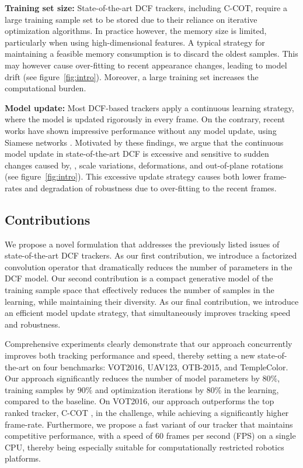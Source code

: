 \documentclass[10pt,twocolumn,letterpaper]{article}
\newcommand{\parsection}[1]{\noindent\textbf{#1:}}
\begin{document}
\parsection{Training set size}
State-of-the-art DCF trackers, including C-COT, require a large training sample set to be stored due to their reliance on iterative optimization algorithms. In practice however, the memory size is limited, particularly when using high-dimensional features. A typical strategy for maintaining a feasible memory consumption is to discard the oldest samples. This may however cause over-fitting to recent appearance changes, leading to model drift (see figure~\ref{fig:intro}). Moreover, a large training set increases the computational burden.

\parsection{Model update}
Most DCF-based trackers apply a continuous learning strategy, where the model is updated rigorously in every frame. On the contrary, recent works have shown impressive performance without any model update, using Siamese networks \cite{SiameseFC}. Motivated by these findings, we argue that the continuous model update in state-of-the-art DCF is excessive and sensitive to sudden changes caused by, \eg, scale variations, deformations, and out-of-plane rotations (see figure~\ref{fig:intro}). This excessive update strategy causes both lower frame-rates and degradation of robustness due to over-fitting to the recent frames.

\subsection{Contributions}
We propose a novel formulation that addresses the previously listed issues of state-of-the-art DCF trackers. As our first contribution, we introduce a factorized convolution operator that dramatically reduces the number of parameters in the DCF model. Our second contribution is a compact generative model of the training sample space that effectively reduces the number of samples in the learning, while maintaining their diversity. As our final contribution, we introduce an efficient model update strategy, that simultaneously improves tracking speed and robustness. 

Comprehensive experiments clearly demonstrate that our approach concurrently improves both tracking performance and speed, thereby setting a new state-of-the-art on four benchmarks: VOT2016, UAV123, OTB-2015, and TempleColor. Our approach significantly reduces the number of model parameters by $80 \%$, training samples by $90 \%$ and optimization iterations by $80 \%$ in the learning, compared to the baseline. On VOT2016, our approach outperforms the top ranked tracker, C-COT \cite{DanelljanECCV2016}, in the challenge, while achieving a significantly higher frame-rate. Furthermore, we propose a fast variant of our tracker that maintains competitive performance, with a speed of 60 frames per second (FPS) on a single CPU, thereby being especially suitable for computationally restricted robotics platforms. 
\end{document}
